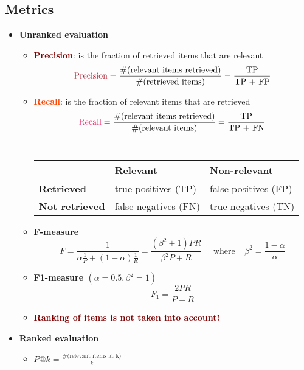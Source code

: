 \subsection{Metrics}
\begin{itemize}
    \item \textbf{Unranked evaluation}
    \begin{itemize}
        \item \textbf{\textcolor{Maroon}{Precision}}: is the fraction of retrieved items that are relevant \\
        $$\text{\textcolor{Maroon}{Precision}} = \frac{\text{\#(relevant items retrieved)}}{\text{\#(retrieved items)}} = \frac{\text{TP}}{\text{TP + FP}}$$
        \item \textbf{\textcolor{OrangeRed}{Recall}}: is the fraction of relevant items that are retrieved \\
        $$\text{\textcolor{OrangeRed}{Recall}} = \frac{\text{\#(relevant items retrieved)}}{\text{\#(relevant items)}} = \frac{\text{TP}}{\text{TP + FN}}$$
        \\
        \begin{tabular}{l|ll}
        \hline & \textbf{Relevant} & \textbf{Non-relevant} \\
        \hline \textbf{Retrieved} & true positives (TP) & false positives (FP) \\
        \textbf{Not retrieved} & false negatives (FN) & true negatives (TN) \\
        \hline
        \end{tabular}
        \vspace{0.2cm}
        \item \textbf{\textcolor{JungleGreen}{F-measure}} \\
        $$F=\frac{1}{\alpha \frac{1}{P}+(1-\alpha) \frac{1}{R}}=\frac{\left(\beta^{2}+1\right) P R}{\beta^{2} P+R} \;\;\;\;\; \text{where} \;\;\;\; \beta^2 = \frac{1 - \alpha}{\alpha}$$ 
        \item \textbf{\textcolor{OliveGreen}{F1-measure $(\alpha = 0.5, \beta^2 = 1)$}} \\
        $$F_{1}=\frac{2 P R}{P+R}$$
        \item \textbf{\textcolor{Maroon}{Ranking of items is not taken into account!}}
    \end{itemize}
    \item \textbf{Ranked evaluation}
    \begin{itemize}
        \item{ $P@k = \frac{\text{\#(relevant items at k)}}{k}$}

\end{itemize}
\end{itemize}
